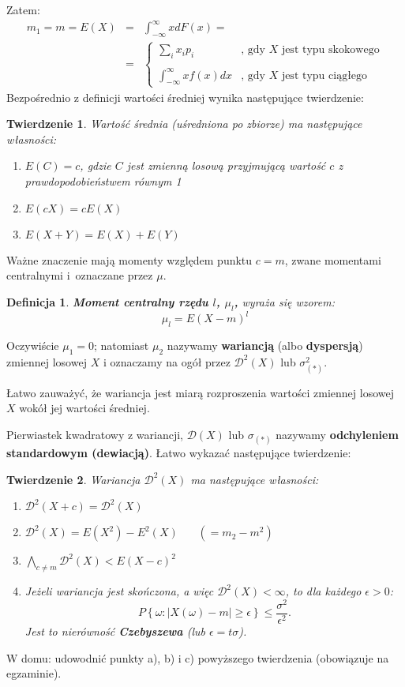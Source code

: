 \documentclass[10pt,a4paper]{article}
\newtheorem{defin}{Definicja}[section]
\newtheorem{twier}{Twierdzenie}[section]
\begin{document}
Zatem:
\begin{eqnarray}
m_1 = m = E(X) & = & \int_{-\infty}^{\infty}xdF(x) = \\
\nonumber
& = & \left\{ \begin{array}{ll}
\sum_ix_ip_i & \textrm{, gdy $X$ jest typu skokowego}\\ \\
\int_{-\infty}^{\infty}xf(x)dx & \textrm{, gdy $X$ jest typu ciągłego}
\end{array} \right.
\end{eqnarray}
Bezpośrednio z definicji wartości średniej wynika następujące twierdzenie:
\begin{twier}
Wartość średnia (uśredniona po zbiorze) ma następujące własności:
\begin{enumerate}
\item[a)] $E(C) = c$, gdzie $C$ jest zmienną losową przyjmującą wartość $c$ z prawdopodobieństwem równym 1
\item[b)] $E(cX) = cE(X)$
\item[c)] $E(X+Y) = E(X) + E(Y)$
\end{enumerate}
\end{twier}

Ważne znaczenie mają momenty względem punktu  $c=m$, zwane momentami centralnymi i~oznaczane przez $\mu$.
\begin{defin}
\textbf{Moment centralny rzędu $l$, $\mu_l$,} wyraża się wzorem:
\begin{equation}
\mu_l = E(X-m)^l
\end{equation}
\end{defin}
Oczywiście $\mu_1 = 0$; natomiast $\mu_2$ nazywamy \textbf{wariancją} (albo \textbf{dyspersją}) zmiennej losowej $X$ i oznaczamy na ogół przez $\mathscr{D}^2(X)$ lub
$\sigma_{(*)}^2$.

Łatwo zauważyć, że wariancja jest miarą rozproszenia wartości zmiennej losowej $X$ wokół jej  wartości średniej.

Pierwiastek kwadratowy z wariancji, $\mathscr{D}(X)$ lub $\sigma_{(*)}$ nazywamy \textbf{odchyleniem standardowym (dewiacją)}. Łatwo wykazać następujące twierdzenie:
\begin{twier}
Wariancja $\mathscr{D}^2(X)$ ma następujące własności:
\begin{enumerate}
\item[a)] $\mathscr{D}^2(X+c) = \mathscr{D}^2{(X)}$
\item[b)] $\mathscr{D}^2(X) = E(X^2) - E^2(X)~~~~~~~~(=m_2-m^2)$
\item[c)] $\bigwedge_{c\neq m}\mathscr{D}^2(X)<E(X-c)^2$
\item[d)] Jeżeli wariancja jest skończona, a więc $\mathscr{D}^2(X)<\infty$, to dla każdego $\epsilon > 0$:
\[P\left\{\omega:|X(\omega)-m|\geq \epsilon\right\}\leq \frac{\sigma^2}{\epsilon^2}.\]
Jest to nierówność \textbf{Czebyszewa} (lub $\epsilon = t\sigma$).
\end{enumerate}
\end{twier}
W domu: udowodnić punkty a), b) i c) powyższego twierdzenia (obowiązuje na egzaminie).
\end{document}
